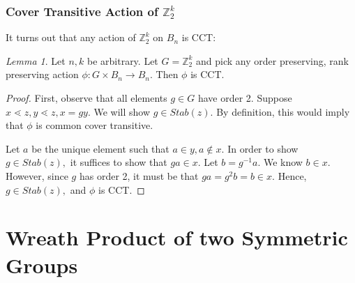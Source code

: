 \documentclass[10 pt]{amsart}
\theoremstyle{plain}
\theoremstyle{definition}
\theoremstyle{remark}
\numberwithin{equation}{section}
\newtheorem{lem}[thm]{Lemma}
\newtheorem{prop}[thm]{Proposition}
\theoremstyle{remark}
\newcommand\sssec{\subsubsection}
\newcommand\BR{{\mathbb R}}
\newcommand\BBZ{{\mathbb Z}}
\newcommand\BZ{{\mathbb Z}}
\begin{document}
\sssec{Cover Transitive Action of $\BZ_2^k$}

It turns out that any action of $\BBZ_2^k$ on $B_n$ is CCT:

\begin{lem}
\label{lem:order_2_CCT}
Let $n,k$ be arbitrary. Let $G = \BBZ_2^k$ and pick any order preserving, rank preserving action $\phi:G\times B_n \rightarrow B_n.$ Then $\phi$ is CCT.
\end{lem}
\begin{proof}
First, observe that all elements $g \in G$ have order 2. Suppose $x \lessdot z, y \lessdot z, x = gy.$ We will show $g \in Stab(z).$ By definition, this would imply that $\phi$ is common cover transitive. 

Let $a$ be the unique element such that $a \in y, a \notin x.$ In order to show $g \in Stab(z),$ it suffices to show that $ga \in x.$ Let $b = g^{-1}a.$ We know $b \in x.$ However, since $g$ has order 2, it must be that $ga = g^2 b = b \in x.$ Hence, $g \in Stab(z),$ and $\phi$ is CCT.
\end{proof}

\iffalse
\begin{prop}
Let $G$ be the group of linear automorphisms of the cube, embedded in $\BR^n,$ whose vertices are located at the points $(\pm 1, \ldots, \pm 1).$ Then, the action of $G$ on the cube induces an action of $G$ on the $2^n$ vertices of the octahdron, and hence on $B_{2^n}.$ This induced action on $B_{2^n}$ is CCT. 
\end{prop}
\begin{proof}
It is easy to see that the group of linear automorphisms of the cube can be written as the semidirect product $\BZ^n_2 \rtimes S_n.$ The generator of the $i^{th}$ copy of $\BZ_2$ in $\BZ^n_2,$ acts by changing the sign of the $i^{th}$ coordinate, while $S_n$ acts by permuting the coordinates. Using Proposition ~\ref{prop:semidirect_product_cover_transitive_actions}, it suffices to show that the action of $\BZ_2^n$ on $B_{2^n}$ is CCT and the action of $S_n$ on $B_{2^n}/(\BZ_2^n)$ is CCT.

First, by Lemma ~\ref{lem:order_2_CCT}, we know the action of $\BZ_2^n$ on $B_{2^n}$ is CCT. Second, we wish to examine the action of $S_n$ on the quotient poset $B_{2^n}/(\BZ_2^n).$ 
\end{proof}
\fi

\section{Wreath Product of two Symmetric Groups}
\end{document}

